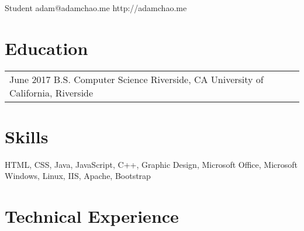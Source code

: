\documentclass[print]{friggeri-cv} %
\makeatletter
\renewenvironment{entrylist}{%
	\par\begin{tabular*}{\textwidth}{@{\extracolsep{\fill}}ll}
	}{%
\end{tabular*}\par
}
\makeatother
\begin{document}
{Student} %
{adam@adamchao.me}
{http://adamchao.me}

\hfill

\section{Education}
\begin{entrylist}
\entry
	{June 2017}
	{B.S. Computer Science}
	{Riverside, CA}
	{University of California, Riverside}
\end{entrylist}


\section{Skills}
HTML, CSS, Java, JavaScript, C++, Graphic Design, Microsoft Office, Microsoft Windows, Linux, IIS, Apache, Bootstrap


\section{Technical Experience}
\end{document}
